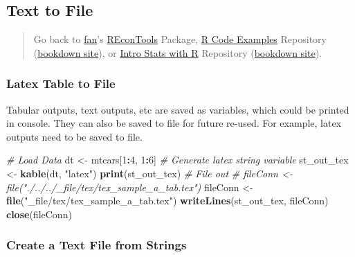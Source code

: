 \documentclass[
]{book}
\newenvironment{Shaded}{\begin{snugshade}}{\end{snugshade}}
\newcommand{\CommentTok}[1]{\textcolor[rgb]{0.56,0.35,0.01}{\textit{#1}}}
\newcommand{\DecValTok}[1]{\textcolor[rgb]{0.00,0.00,0.81}{#1}}
\newcommand{\KeywordTok}[1]{\textcolor[rgb]{0.13,0.29,0.53}{\textbf{#1}}}
\newcommand{\NormalTok}[1]{#1}
\newcommand{\OperatorTok}[1]{\textcolor[rgb]{0.81,0.36,0.00}{\textbf{#1}}}
\newcommand{\StringTok}[1]{\textcolor[rgb]{0.31,0.60,0.02}{#1}}
\begin{document}
\hypertarget{text-to-file}{%
\subsection{Text to File}\label{text-to-file}}

\begin{quote}
Go back to \href{http://fanwangecon.github.io/}{fan}'s \href{https://fanwangecon.github.io/REconTools/}{REconTools} Package, \href{https://fanwangecon.github.io/R4Econ/}{R Code Examples} Repository (\href{https://fanwangecon.github.io/R4Econ/bookdown}{bookdown site}), or \href{https://fanwangecon.github.io/Stat4Econ/}{Intro Stats with R} Repository (\href{https://fanwangecon.github.io/Stat4Econ/bookdown}{bookdown site}).
\end{quote}

\hypertarget{latex-table-to-file}{%
\subsubsection{Latex Table to File}\label{latex-table-to-file}}

Tabular outputs, text outputs, etc are saved as variables, which could be printed in console. They can also be saved to file for future re-used. For example, latex outputs need to be saved to file.

\begin{Shaded}
\begin{Highlighting}[]
\CommentTok{\# Load Data}
\NormalTok{dt \textless{}{-}}\StringTok{ }\NormalTok{mtcars[}\DecValTok{1}\OperatorTok{:}\DecValTok{4}\NormalTok{, }\DecValTok{1}\OperatorTok{:}\DecValTok{6}\NormalTok{]}
\CommentTok{\# Generate latex string variable}
\NormalTok{st\_out\_tex \textless{}{-}}\StringTok{ }\KeywordTok{kable}\NormalTok{(dt, }\StringTok{"latex"}\NormalTok{)}
\KeywordTok{print}\NormalTok{(st\_out\_tex)}
\CommentTok{\# File out}
\CommentTok{\# fileConn \textless{}{-} file("./../../\_file/tex/tex\_sample\_a\_tab.tex")}
\NormalTok{fileConn \textless{}{-}}\StringTok{ }\KeywordTok{file}\NormalTok{(}\StringTok{"\_file/tex/tex\_sample\_a\_tab.tex"}\NormalTok{)}
\KeywordTok{writeLines}\NormalTok{(st\_out\_tex, fileConn)}
\KeywordTok{close}\NormalTok{(fileConn)}
\end{Highlighting}
\end{Shaded}

\hypertarget{create-a-text-file-from-strings}{%
\subsubsection{Create a Text File from Strings}\label{create-a-text-file-from-strings}}
\end{document}
